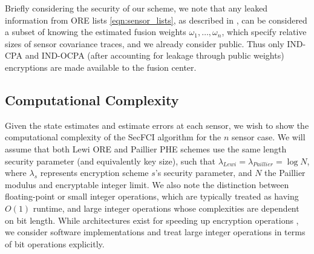 \documentclass[letterpaper, 10 pt, conference]{ieeeconf}  %
\begin{document}
Briefly considering the security of our scheme, we note that any leaked information from ORE lists \eqref{eqn:sensor_lists}, as described in \cite{chenettePracticalOrderRevealingEncryption2016}, can be considered a subset of knowing the estimated fusion weights $\omega_1,\dots,\omega_n$, which specify relative sizes of sensor covariance traces, and we already consider public. Thus only IND-CPA and IND-OCPA (after accounting for leakage through public weights) encryptions are made available to the fusion center.

\subsection{Computational Complexity} \label{subsec:complexity}
Given the state estimates and estimate errors at each sensor, we wish to show the computational complexity of the SecFCI algorithm for the $n$ sensor case. We will assume that both Lewi ORE and Paillier PHE schemes use the same length security parameter (and equivalently key size), such that $\lambda_{Lewi} = \lambda_{Paillier} = \log{N}$, where $\lambda_{s}$ represents encryption scheme $s$'s security parameter, and $N$ the Paillier modulus and encryptable integer limit. We also note the distinction between floating-point or small integer operations, which are typically treated as having $O(1)$ runtime, and large integer operations whose complexities are dependent on bit length. While architectures exist for speeding up encryption operations \cite{gueronIntelAdvancedEncryption2010}, we consider software implementations and treat large integer operations in terms of bit operations explicitly.
\end{document}
